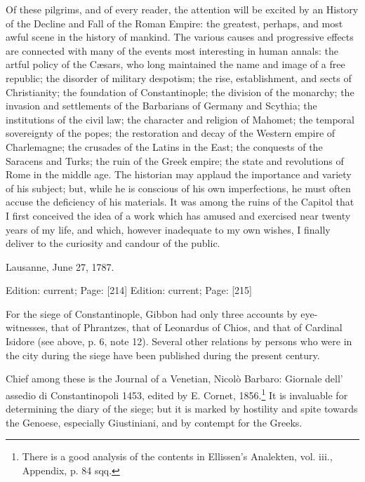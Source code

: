 Of these pilgrims, and of every reader, the attention will be excited by an History of the Decline and Fall of the Roman Empire: the greatest, perhaps, and most awful scene in the history of mankind. The various causes and progressive effects are connected with many of the events most interesting in human annals: the artful policy of the Cæsars, who long maintained the name and image of a free republic; the disorder of military despotism; the rise, establishment, and sects of Christianity; the foundation of Constantinople; the division of the monarchy; the invasion and settlements of the Barbarians of Germany and Scythia; the institutions of the civil law; the character and religion of Mahomet; the temporal sovereignty of the popes; the restoration and decay of the Western empire of Charlemagne; the crusades of the Latins in the East; the conquests of the Saracens and Turks; the ruin of the Greek empire; the state and revolutions of Rome in the middle age. The historian may applaud the importance and variety of his subject; but, while he is conscious of his own imperfections, he must often accuse the deficiency of his materials. It was among the ruins of the Capitol that I first conceived the idea of a work which has amused and exercised near twenty years of my life, and which, however inadequate to my own wishes, I finally deliver to the curiosity and candour of the public.

Lausanne, June 27, 1787.

Edition: current; Page: [214]
Edition: current; Page: [215]



For the siege of Constantinople, Gibbon had only three accounts by eye-witnesses, that of Phrantzes, that of Leonardus of Chios, and that of Cardinal Isidore (see above, p. 6, note 12). Several other relations by persons who were in the city during the siege have been published during the present century.

Chief among these is the Journal of a Venetian, Nicolò Barbaro: Giornale dell\texthebrew{}’ assedio di Constantinopoli 1453, edited by E. Cornet, 1856.\footnote{There is a good analysis of the contents in Ellissen\texthebrew{}’s Analekten, vol. iii., Appendix, p. 84 sqq.} It is invaluable for determining the diary of the siege; but it is marked by hostility and spite towards the Genoese, especially Giustiniani, and by contempt for the Greeks.


